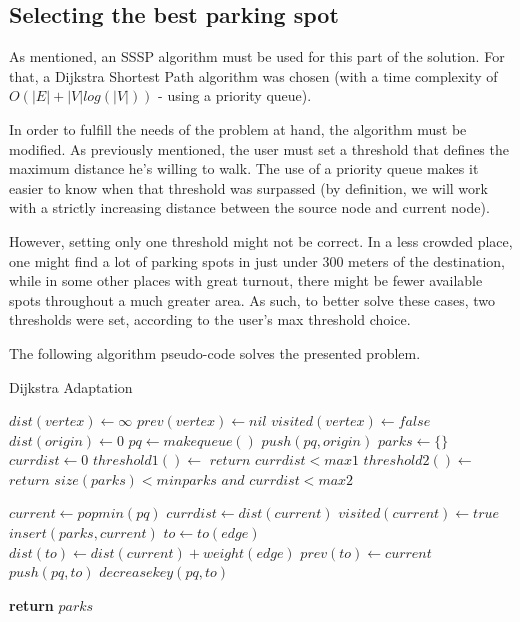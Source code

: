 \documentclass[a4paper, 12pt]{report}
\begin{document}
    \subsection{Selecting the best parking spot}  \label{selectpark}
    
    As mentioned, an SSSP algorithm must be used for this part of the solution. For that, a Dijkstra Shortest Path algorithm was chosen (with a time complexity of $O(|E| + |V|log(|V|))$ - using a priority queue).
    
    In order to fulfill the needs of the problem at hand, the algorithm must be modified. As previously mentioned, the user must set a threshold that defines the maximum distance he's willing to walk. The use of a priority queue makes it easier to know when that threshold was surpassed (by definition, we will work with a strictly increasing distance between the source node and current node). 
    
    However, setting only one threshold might not be correct. In a less crowded place, one might find a lot of parking spots in just under 300 meters of the destination, while in some other places with great turnout, there might be fewer available spots throughout a much greater area. As such, to better solve these cases, two thresholds were set, according to the user's max threshold choice.
    
    The following algorithm pseudo-code solves the presented problem.
    
    \begin{algorithm}[H]
    	\caption{Dijkstra Adaptation} 
	    \begin{algorithmic}[1]
		    \State $dist(vertex) \leftarrow \infty$
		    \State $prev(vertex) \leftarrow nil$
		    \State $visited(vertex) \leftarrow false$
		\EndFor
		\State $dist(origin) \leftarrow 0$
		\State $pq \leftarrow makequeue()$
		\State $push(pq, origin)$
		\State
		\State $parks \leftarrow \{\}$
		\State $currdist \leftarrow 0$
		\State $threshold1() \leftarrow $ $return$ $currdist < max1$
		\State $threshold2() \leftarrow $ $return$ $size(parks) < minparks$ $and$ $currdist < max2$
		\State
		
		    \State $current \leftarrow popmin(pq)$
		    \State $currdist \leftarrow dist(current)$
		    \State $visited(current) \leftarrow true$
		        \State $insert(parks, current)$
		    \EndIf
		        \State $to \leftarrow to(edge)$
		            \State $dist(to) \leftarrow dist(current) + weight(edge)$
		            \State $prev(to) \leftarrow current$
		                \State $push(pq, to)$
		            \Else
		                \State $decreasekey(pq, to)$
		            \EndIf
		        \EndIf
		    \EndFor
		\EndWhile
		
		\State \textbf{return} $parks$
	    \end{algorithmic} 
    \end{algorithm}
    
\end{document}
